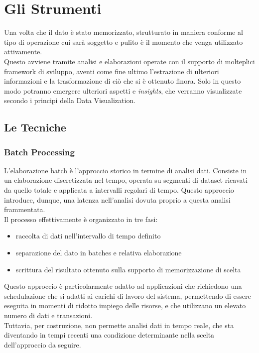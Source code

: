 \chapter{Gli Strumenti}

Una volta che il dato è stato memorizzato, strutturato in maniera conforme al tipo di operazione cui sarà soggetto e pulito è il momento che venga utilizzato attivamente.\\
Questo avviene tramite analisi e elaborazioni operate con il supporto di molteplici framework di sviluppo, aventi come fine ultimo l'estrazione di ulteriori informazioni e la trasformazione di ciò che si è ottenuto finora. Solo in questo modo potranno emergere ulteriori aspetti e \textit{insights}, che verranno visualizzate secondo i principi della Data Visualization.

\section{Le Tecniche}

\subsection{Batch Processing}
L'elaborazione batch è l'approccio storico in termine di analisi dati. Consiste in un elaborazione discretizzata nel tempo, operata su segmenti di dataset ricavati da quello totale e applicata a intervalli regolari di tempo. Questo approccio introduce, dunque, una latenza nell'analisi dovuta proprio a questa analisi frammentata.\\
Il processo effettivamente è organizzato in tre fasi:
\begin{itemize}
	\item raccolta di dati nell'intervallo di tempo definito
	
	\item separazione del dato in batches e relativa elaborazione

    \item scrittura del risultato ottenuto sulla supporto di memorizzazione di scelta
\end{itemize} 
Questo approccio è particolarmente adatto ad applicazioni che richiedono una schedulazione che si adatti ai carichi di lavoro del sistema, permettendo di essere eseguita in momenti di ridotto impiego delle risorse, e che utilizzano un elevato numero di dati e transazioni.\\
Tuttavia, per costruzione, non permette analisi dati in tempo reale, che sta diventando in tempi recenti una condizione determinante nella scelta dell'approccio da seguire.

